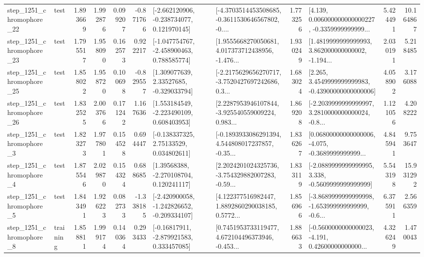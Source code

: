 \begin{tabular}{llrrrrllrlrr}
 step\_1251\_chromophore\_22 &      test &      1.893669 &    1.992876 &      0.099207 & -0.871766 &   [-2.662120906, -0.238734077, 0.121970145] &  [-4.3703514453508685, -0.3611530646567802, -0.... &       1.773256 &  [4.139, 0.006000000000000227, -0.3359999999999... &            5.424491 &         10.164867 \\
 step\_1251\_chromophore\_23 &      test &      1.795517 &    1.958090 &      0.162573 &  0.922217 &   [-1.047754767, -2.458900463, 0.788585774] &  [1.9555668270050681, 4.017373712438956, -1.476... &       1.930249 &  [1.4819999999999993, 3.862000000000002, -1.194... &            2.030191 &          5.218485 \\
 step\_1251\_chromophore\_25 &      test &      1.858022 &    1.958720 &      0.100698 & -0.829557 &     [1.309077639, 2.33527685, -0.329033794] &  [-2.2175629656270717, -3.7520427697242686, 0.3... &       1.683024 &  [2.265, 3.4549999999999983, -0.43900000000000006] &            4.058902 &          3.176088 \\
 step\_1251\_chromophore\_26 &      test &      1.832525 &    2.003766 &      0.171242 &  1.167636 &    [1.553184549, -2.223490109, 0.608403953] &  [2.2287953946107844, -3.925540559009224, 0.983... &       1.869208 &  [-2.2039999999999997, 3.2810000000000024, -0.8... &            1.121056 &          4.208222 \\
  step\_1251\_chromophore\_3 &      test &      1.823273 &    1.977801 &      0.154528 &  0.694447 &     [-0.138337325, 2.75133529, 0.034802611] &  [-0.1893933086291394, 4.544808017237857, -0.35... &       1.836267 &  [0.06800000000000006, -4.075, -0.3689999999999... &            4.845941 &          9.753647 \\
  step\_1251\_chromophore\_4 &      test &      1.875546 &    2.029870 &      0.154324 &  0.688685 &     [1.39568388, -2.270108704, 0.120241117] &  [2.2024201024325736, -3.754329882007283, -0.59... &       1.833119 &  [-2.0889999999999995, 3.338, -0.5609999999999999] &            5.543198 &         15.931292 \\
  step\_1251\_chromophore\_5 &      test &      1.843491 &    1.926223 &      0.082733 & -1.338185 &  [-2.420900058, -1.242826652, -0.209334107] &  [4.122377516982447, 1.8892860290038185, 0.5772... &       1.856966 &  [-3.8689999999999998, -1.653999999999999, -0.6... &            6.375911 &          2.566359 \\
  step\_1251\_chromophore\_8 &  training &      1.858811 &    1.999174 &      0.140364 &  0.293433 &    [-0.16817911, -2.879921583, 0.333457085] &  [0.7451953733119477, 4.672104496373946, -0.453... &       1.886633 &  [-0.5600000000000023, -4.191, 0.42600000000000... &            4.326249 &          1.470043 \\

\end{tabular}
